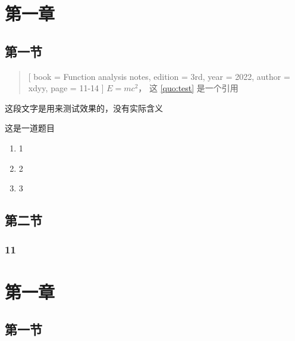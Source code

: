 \documentclass{xdyy-notes}
\begin{document}
\maketitle

\frontmatter

\begin{preface}
  \zhlipsum[1-3]
\end{preface}

\tableofcontents

\mainmatter

\chapter{第一章}

\section{第一节}

\begin{quotation}[
  book = {Function analysis notes},
  edition = {3rd},
  year = {2022},
  author = {xdyy},
  page = {11-14}
]\label{quo:test}
  $E = m c^2$， 这 \ref{quo:test} 是一个引用
\end{quotation}


\begin{detail}[
  book = {《泛函分析讲义》},
  author = {许全华},
  edition = {第一版},
  year = {2017},
  page = {103},
  original = {
    \zhlipsum[1-2]
  }
]
  这段文字是用来测试效果的，没有实际含义
\end{detail}


\begin{exercise}
  这是一道题目
  \begin{enumerate}
    \item 1
    \item 2
    \item 3
  \end{enumerate}
\end{exercise}


\correction[
  book = {《摸鱼讲义》},
  author = {夏康玮},
  edition = {第一版},
  year = {2022},
  page = {88},
  original = {
    $1+1 = 3$
  },
  revision = {
    $1+1 = 2$
  },
  explanation = {
    常识性问题，无须多言
    然后呢
  }
]

\section{第二节}


\zhlipsum[1-6]






\subsection{11}


\zhlipsum[1-2]



\chapter{第一章}

\section{第一节}
\cite{DiophantineQueffelec}


\backmatter
\printbibliography
\end{document}
